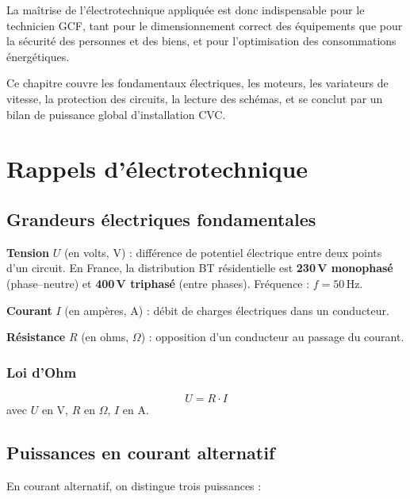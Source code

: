 La maîtrise de l'électrotechnique appliquée est donc indispensable pour le technicien GCF, tant pour le dimensionnement correct des équipements que pour la sécurité des personnes et des biens, et pour l'optimisation des consommations énergétiques.

Ce chapitre couvre les fondamentaux électriques, les moteurs, les variateurs de vitesse, la protection des circuits, la lecture des schémas, et se conclut par un bilan de puissance global d'installation CVC.

\section{Rappels d'électrotechnique}

\subsection{Grandeurs électriques fondamentales}

\begin{definition}
  \textbf{Tension} $U$ (en volts, V) : différence de potentiel électrique entre deux points d'un circuit. En France, la distribution BT résidentielle est \textbf{230\,V monophasé} (phase--neutre) et \textbf{400\,V triphasé} (entre phases). Fréquence : $f = 50\,\text{Hz}$.

  \textbf{Courant} $I$ (en ampères, A) : débit de charges électriques dans un conducteur.

  \textbf{Résistance} $R$ (en ohms, $\Omega$) : opposition d'un conducteur au passage du courant.
\end{definition}

\subsubsection{Loi d'Ohm}

\begin{equation}
  U = R \cdot I
\end{equation}
avec $U$ en V, $R$ en $\Omega$, $I$ en A.

\subsection{Puissances en courant alternatif}

En courant alternatif, on distingue trois puissances :

